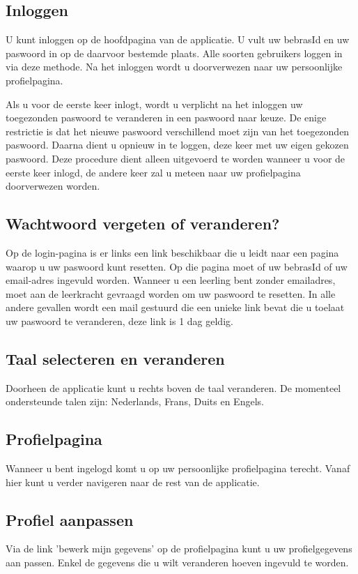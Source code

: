 \documentclass[11pt,a4paper]{report}
\begin{document}
\subsection{Inloggen}
U kunt inloggen op de hoofdpagina van de applicatie. U vult uw bebrasId en uw paswoord in op de daarvoor bestemde plaats. Alle soorten gebruikers loggen in via deze methode. Na het inloggen wordt u doorverwezen naar uw persoonlijke profielpagina.
\par
Als u voor de eerste keer inlogt, wordt u verplicht na het inloggen uw toegezonden paswoord te veranderen in een paswoord naar keuze. De enige restrictie is dat het nieuwe paswoord verschillend moet zijn van het toegezonden paswoord. Daarna dient u opnieuw in te loggen, deze keer met uw eigen gekozen paswoord. Deze procedure dient alleen uitgevoerd te worden wanneer u voor de eerste keer inlogd, de andere keer zal u meteen naar uw  profielpagina doorverwezen worden. 

\subsection{Wachtwoord vergeten of veranderen?}
Op de login-pagina is er links een link beschikbaar die u leidt naar een pagina waarop u uw paswoord kunt resetten. Op die pagina moet of uw bebrasId of  uw email-adres ingevuld worden. Wanneer u een leerling bent zonder emailadres, moet aan de leerkracht gevraagd worden om uw paswoord te resetten. In alle andere gevallen wordt een mail gestuurd die een unieke link bevat die u toelaat uw paswoord te veranderen, deze link is 1 dag geldig.

\subsection{Taal selecteren en veranderen}
Doorheen de applicatie kunt u rechts boven de taal veranderen. 
De momenteel ondersteunde talen zijn: Nederlands, Frans, Duits en Engels.

\subsection{Profielpagina}
Wanneer u bent ingelogd komt u op uw persoonlijke profielpagina terecht. 
Vanaf hier kunt u verder navigeren naar de rest van de applicatie.

\subsection{Profiel aanpassen}
Via de link 'bewerk mijn gegevens' op de profielpagina kunt u uw profielgegevens aan  passen. 
Enkel de gegevens die u wilt veranderen hoeven ingevuld te worden. 
\end{document}
